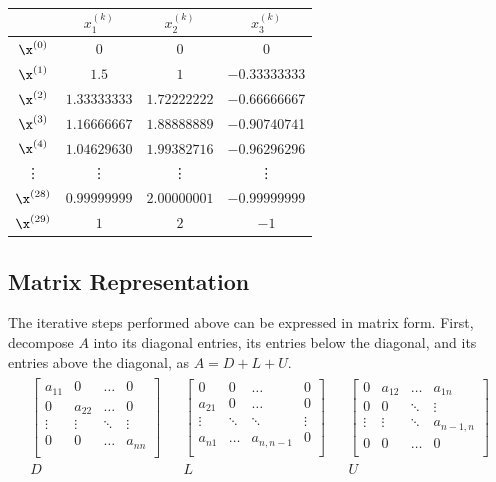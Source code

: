 \begin{center}
\begin{tabular}{c|ccc}
    & $x^{(k)}_1$ & $x^{(k)}_2$ & $x^{(k)}_3$ \\
    \hline
    $\x^{(0)}$ & $0$ & $0$ & $0$ \\
    $\x^{(1)}$ & $1.5$ & $1$ & $-0.33333333$ \\
    $\x^{(2)}$  & $1.33333333$ & $1.72222222$ & $-0.6666666$7 \\
    $\x^{(3)}$  & $1.16666667$ & $1.88888889$ & $-0.9074074$1 \\
    $\x^{(4)}$  & $1.04629630$ & $1.99382716$ & $-0.9629629$6 \\
    \vdots      & \vdots       & \vdots       & \vdots      \\
    $\x^{(28)}$ & $0.99999999$ & $2.00000001$ & $-0.9999999$9 \\
    $\x^{(29)}$ & $1$          & $2$          & $-1$          \\
\end{tabular}
\end{center}

\subsection*{Matrix Representation} %

The iterative steps performed above can be expressed in matrix form.
First, decompose $A$ into its diagonal entries, its entries below the diagonal, and its entries above the diagonal, as $A = D + L + U$.
\begin{align*}
\begin{array}{ccccc}
    \left[\begin{array}{cccc}
        a_{11} & 0 & \ldots & 0 \\
        0 & a_{22} & \ldots & 0 \\
        \vdots & \vdots & \ddots & \vdots \\
        0 & 0 & \ldots & a_{nn} \\
    \end{array}\right]
    & &
    \left[\begin{array}{cccc}
    0 & 0 & \ldots & 0 \\
    a_{21} &  0 & \ldots & 0\\
     \vdots & \ddots & \ddots & \vdots \\
    a_{n1} & \ldots & a_{n,n-1} & 0 \\
    \end{array}\right]
    & &
    \left[\begin{array}{cccc}
    0 & a_{12} & \ldots & a_{1n} \\
    0 & 0 & \ddots & \vdots \\
     \vdots & \vdots & \ddots & a_{n-1,n} \\
    0 & 0 & \ldots & 0 \\
    \end{array}\right]
    \\D & & L & & U
\end{array}
\end{align*}

